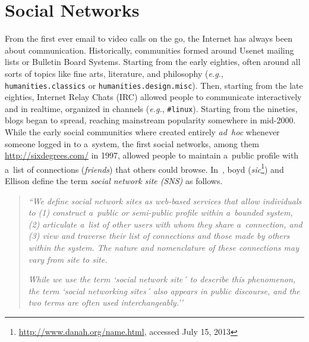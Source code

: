 \chapter{Social Networks}
\label{cha:social-networks}

\ifpdf
    \graphicspath{{3_social_networks/figures/PNG/}{3_social_networks/figures/PDF/}{3_social_networks/figures/}}
\else
    \graphicspath{{3_social_networks/figures/EPS/}{3_social_networks/figures/}}
\fi

From the first ever email to video calls on the go,
the Internet has always been about communication.
Historically, communities formed around Usenet mailing lists or Bulletin Board Systems.
Starting from the early eighties,
often around all sorts of topics like fine arts,
literature, and philosophy (\emph{e.g.}, \texttt{humanities.classics}
or \texttt{humanities.\-design.misc}).
Then, starting from the late eighties, Internet Relay Chats (IRC)
allowed people to communicate interactively and in realtime,
organized in channels (\emph{e.g.}, \texttt{\#linux}).
Starting from the nineties, blogs began to spread,
reaching mainstream popularity somewhere in mid-2000.
While the early social communities
where created entirely \emph{ad~hoc}
whenever someone logged in to a~system,
the first social networks,
among them \url{http://sixdegrees.com/} in 1997,
allowed people to maintain a~public profile
with a~list of connections (\emph{friends})
that others could browse.
In~\cite{boyd2007socialnetworksites}, boyd
(\emph{sic}\footnote{\url{http://www.danah.org/name.html}, accessed July 15, 2013})
and Ellison define the term
\emph{social network site (SNS)} as follows.

\begin{quotation}
  \textit{``We define social network sites as web-based services
  that allow individuals to
  (1) construct a~public or
  semi-public profile within a~bounded system,
  (2) articulate a~list of other users
  with whom they share a~connection, and
  (3) view and traverse their list of connections
  and those made by others within the system.
  The nature and nomenclature of these connections
  may vary from site to site.}

  \textit{While we use the term `social network site´ to 
  describe this phenomenon, the term `social
  networking sites´ also appears in public discourse,
  and the two terms are often used interchangeably.''}
\end{quotation}

